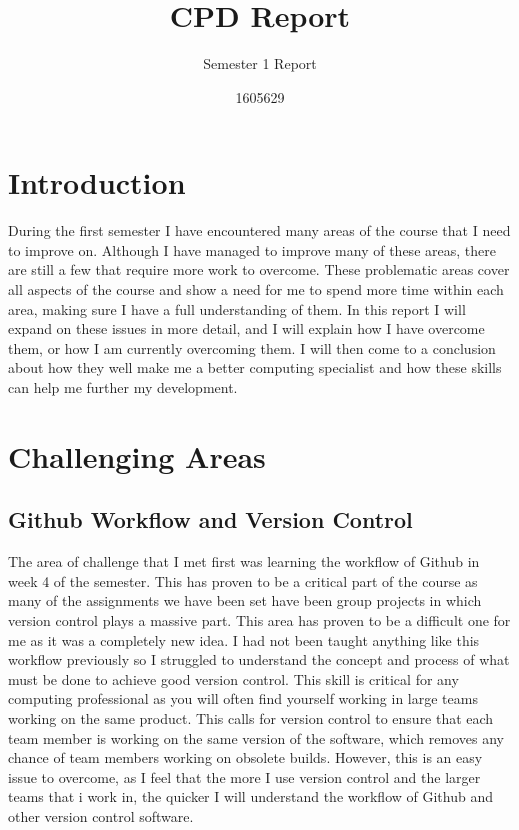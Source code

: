 \documentclass{scrartcl}
\title{CPD Report}
\subtitle{Semester 1 Report}
\author{1605629}
\begin{document}
\maketitle

\section{Introduction}
During the first semester I have encountered many areas of the course that I need to improve on. Although I have managed to improve many of these areas, there are still a few that require more work to overcome. These problematic areas cover all aspects of the course and show a need for me to spend more time within each area, making sure I have a full understanding of them. In this report I will expand on these issues in more detail, and I will explain how I have overcome them, or how I am currently overcoming them. I will then come to a conclusion about how they well make me a better computing specialist and how these skills can help me further my development.

\section{Challenging Areas}

\subsection{Github Workflow and Version Control}
The area of challenge that I met first was learning the workflow of Github in week 4 of the semester. This has proven to be a critical part of the course as many of the assignments we have been set have been group projects in which version control plays a massive part. This area has proven to be a difficult one for me as it was a completely new idea. I had not been taught anything like this workflow previously so I struggled to understand the concept and process of what must be done to achieve good version control. This skill is critical for any computing professional as you will often find yourself working in large teams working on the same product. This calls for version control to ensure that each team member is working on the same version of the software, which removes any chance of team members working on obsolete builds. However, this is an easy issue to overcome, as I feel that the more I use version control and the larger teams that i work in, the quicker I will understand the workflow of Github and other version control software.
\end{document}
